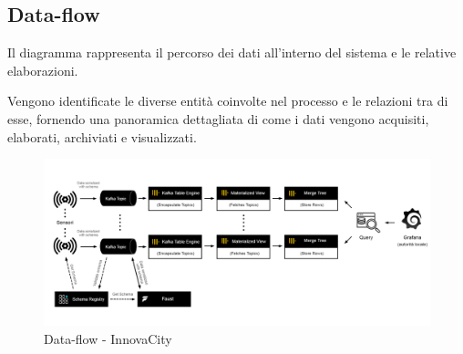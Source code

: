 \subsection{Data-flow}
Il diagramma rappresenta il percorso dei dati all'interno del sistema e le relative elaborazioni.

Vengono identificate le diverse entità coinvolte nel processo e le relazioni tra di esse, fornendo una panoramica dettagliata di come i dati vengono acquisiti, elaborati, archiviati e visualizzati.
\begin{figure}[H]
    \centering
    \includegraphics[width=1\textwidth]{../Images/SpecificaTecnica/data_flow.jpg}
    \caption{Data-flow - InnovaCity}
    \label{fig: dataflow}
\end{figure}


